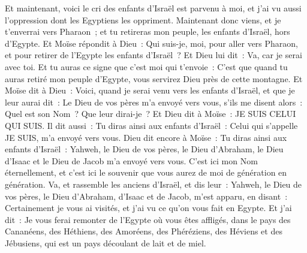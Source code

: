 \begin{multicols}{2}
Et maintenant, voici le cri des enfants d'Israël est parvenu à moi, et j'ai vu aussi l'oppression dont les Egyptiens les oppriment.
Maintenant donc viens, et je t'enverrai vers Pharaon~; et tu retireras mon peuple, les enfants d'Israël, hors d'Egypte.
Et Moïse répondit à Dieu~: Qui suis-je, moi, pour aller vers Pharaon, et pour retirer de l'Egypte les enfants d'Israël~?
Et Dieu lui dit~: Va, car je serai avec toi. Et tu auras ce signe que c'est moi qui t'envoie~: C'est que quand tu auras retiré mon peuple d'Egypte, vous servirez Dieu près de cette montagne.
Et Moïse dit à Dieu~: Voici, quand je serai venu vers les enfants d'Israël, et que je leur aurai dit~: Le Dieu de vos pères m'a envoyé vers vous, s'ils me disent alors~: Quel est son Nom~? Que leur dirai-je~?
 Et Dieu dit à Moïse~: JE SUIS CELUI QUI SUIS. Il dit aussi~: Tu diras ainsi aux enfants d'Israël~: Celui qui s'appelle JE SUIS, m'a envoyé vers vous.
Dieu dit encore à Moïse~: Tu diras ainsi aux enfants d'Israël~: Yahweh, le Dieu de vos pères, le Dieu d'Abraham, le Dieu d'Isaac et le Dieu de Jacob m'a envoyé vers vous. C'est ici mon Nom éternellement, et c'est ici le souvenir que vous aurez de moi de génération en génération.
Va, et rassemble les anciens d'Israël, et dis leur~: Yahweh, le Dieu de vos pères, le Dieu d'Abraham, d'Isaac et de Jacob, m'est apparu, en disant~: Certainement je vous ai visités, et j'ai vu ce qu'on vous fait en Egypte.
Et j'ai dit~: Je vous ferai remonter de l'Egypte où vous êtes affligés, dans le pays des Cananéens, des Héthiens, des Amoréens, des Phéréziens, des Héviens et des Jébusiens, qui est un pays découlant de lait et de miel.

\end{multicols}
